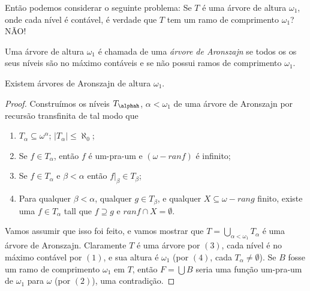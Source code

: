 \documentclass[a4paper]{article}
\theoremstyle{plain}\newtheorem{teo}{Teorema}[section]
\theoremstyle{plain}\newtheorem{prop}[teo]{Proposição}
\theoremstyle{plain}\newtheorem{lem}[teo]{Lema}
\theoremstyle{plain}\newtheorem{cor}[teo]{Corolário}
\theoremstyle{definition}\newtheorem{defi}[teo]{Definição}
\theoremstyle{remark}\newtheorem{rem}[teo]{Observação}
\theoremstyle{definition}\newtheorem{example}[teo]{Exemplo}
\theoremstyle{remark}\newtheorem{step}{\bf Step}
\begin{document}
  
  Então podemos considerar o seguinte problema: Se $T$ é uma árvore de altura $\omega_1$, onde cada nível é contável, é verdade que $T$ tem um ramo de comprimento $\omega_1$? NÃO!
\begin{definition}
  Uma árvore de altura $\omega_1$ é chamada de uma \textit{árvore de Aronszajn} se todos os os seus níveis são no máximo contáveis e se não possui ramos de comprimento $\omega_1$.
\end{definition}
  
\begin{theorem}
  Existem árvores de Aronszajn de altura $\omega_1$.
\end{theorem}

\begin{proof}
  Construímos os níveis $T_{\alphah}$, $\alpha < \omega_1$ de uma árvore de Aronszajn por recursão transfinita de tal modo que
  
  \begin{enumerate}
      \item $T_{\alpha} \subseteq \omega^{\alpha}$; $\left|T_{\alpha}\right| \le \aleph_0$;
      \item Se $f \in T_{\alpha}$, então $f$ é um-pra-um e $(\omega - ranf)$ é infinito;
      \item Se $f \in T_{\alpha}$ e $\beta < \alpha$ então $f |_{\beta} \in T_{\beta}$;
      \item Para qualquer $\beta < \alpha$, qualquer $g \in T_{\beta}$, e qualquer $X \subseteq \omega - rang$ finito, existe uma $f \in T_{\alpha}$ tall que $f \supseteq g$ e $ranf \cap X = \emptyset$.
  \end{enumerate}
  Vamos assumir que isso foi feito, e vamos mostrar que $T = \bigcup_{\alpha < \omega_1}T_{\alpha}$ é uma árvore de Aronszajn. Claramente $T$ é uma árvore por $(3)$, cada nível é no máximo contável por $(1)$, e sua altura é $\omega_1$ (por $(4)$, cada $T_{\alpha} \neq \emptyset$). Se $B$ fosse um ramo de comprimento $\omega_1$ em $T$, então $F = \bigcup B$ seria uma função um-pra-um de $\omega_1$ para $\omega$ (por $(2)$), uma contradição.
  

\end{proof}
\end{document}
